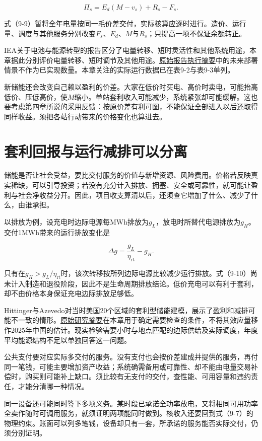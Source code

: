 \documentclass[UTF8,fontset=windows,12pt,a4paper,oneside,openany]{ctexbook}
\begin{document}
\[
\Pi_s=E_d(M-v_s)+R_s-F_s.
\tag{9-9}
\]

式（9-9）暂将全年电量按同一毛价差交付，实际核算应逐时进行。造价、运行量、调度与其他服务分别改变$F_s$、$E_d$、$M$与$R_s$；只提高一项不保证余额转正。

IEA关于电池与能源转型的报告区分了电量转移、短时灵活性和其他系统用途，本章据此分别评价电量转移、短时调节及其他用途。\href{https://www.iea.org/reports/batteries-and-secure-energy-transitions/executive-summary}{原始报告执行摘要}中的未来部署情景不作为已实现数量。本章关注的实际运行数据已在表9-2与表9-3单列。

新储能还会改变自己赖以盈利的价差。大家在低价时买电、高价时卖电，可能抬高低价、压低高价，使\(M\)缩小。单站套利收入可能减少，系统紧张却可能缓解。这也要考虑第四章所说的采用反馈：按原价差有利可图，不能保证全部进入以后还取得同样收益。须把各站行动带来的价格变化也算进去。

\section{套利回报与运行减排可以分离}

储能是否让社会受益，要比交付服务的价值与新增资源、风险费用。价格若反映真实稀缺，可以引导投资；若没有充分计入排放、拥塞、安全或可靠性，就可能让盈利与社会净收益分开。因此，项目收支算清以后，还须查它增加了什么、减少了什么，由谁承担。

以排放为例，设充电时边际电源每MWh排放为\(g_L\)，放电时所替代电源排放为\(g_H\)。交付1MWh带来的运行排放变化是

\[
\Delta g=\frac{g_L}{\eta_{\mathrm{rt}}}-g_H.
\tag{9-10}
\]

只有在\(g_H>g_L/\eta_{\mathrm{rt}}\)时，该次转移按所列边际电源比较减少运行排放。式（9-10）尚未计入制造和退役阶段，因此不是生命周期排放结论。低价充电可以有利于套利，却不由价格本身保证充电边际排放足够低。

Hittinger与Azevedo对当时美国20个区域的套利型储能建模，展示了盈利和减排可能不一致的情形。\href{https://hero.epa.gov/reference/2826816/}{原始研究摘要}在本章用于确定需要检查的条件，不将其效应量移作2025年中国的估计。现实检验需要小时与地点匹配的边际供给及实际调度，年度平均能源结构不足以单独回答这一问题。

公共支付要对应实际多交付的服务。没有支付也会按价差建成并提供的服务，再付同一笔钱，可能主要增加资产收益；系统确需备用或可靠性、却不能由电量交易补偿时，购买则可能补上缺口。须比较有无支付的交付，查性能、可用容量和违约责任，才能分清哪一种情况。

同一设备还可能同时签下多项义务。某时段已承诺全功率放电，又将相同可用功率全卖作随时可调用服务，就须证明两项能同时做到。核收入还要回到式（9-7）的物理约束。账面可以列多笔钱，设备却只有一套，所承诺的服务能否实际交付，仍须分别证明。
\end{document}
